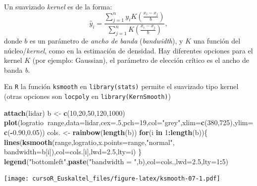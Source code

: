 \documentclass[]{book}
\newenvironment{Shaded}{\begin{snugshade}}{\end{snugshade}}
\newcommand{\KeywordTok}[1]{\textcolor[rgb]{0.13,0.29,0.53}{\textbf{#1}}}
\newcommand{\DataTypeTok}[1]{\textcolor[rgb]{0.13,0.29,0.53}{#1}}
\newcommand{\DecValTok}[1]{\textcolor[rgb]{0.00,0.00,0.81}{#1}}
\newcommand{\FloatTok}[1]{\textcolor[rgb]{0.00,0.00,0.81}{#1}}
\newcommand{\StringTok}[1]{\textcolor[rgb]{0.31,0.60,0.02}{#1}}
\newcommand{\ControlFlowTok}[1]{\textcolor[rgb]{0.13,0.29,0.53}{\textbf{#1}}}
\newcommand{\OperatorTok}[1]{\textcolor[rgb]{0.81,0.36,0.00}{\textbf{#1}}}
\newcommand{\NormalTok}[1]{#1}
\begin{document}
Un suavizado \emph{kernel} es de la forma: \[
\hat{y}_i = \frac{\sum_{j=1}^n y_i K\left( \frac{x_i-x_j}{b}\right)}{\sum_{j=1}^n K\left( \frac{x_i-x_j}{b}\right)},
\] donde \(b\) es un parámetro de \emph{ancho de banda}
(\emph{bandwidth}), y \(K\) una función del núcleo/\emph{kernel}, como
en la estimación de densidad. Hay diferentes opciones para el kernel
\(K\) (por ejemplo: Gaussian), el parámetro de elección crítico es el
ancho de banda \emph{b}.

En \texttt{R} la función \texttt{ksmooth} en \texttt{library(stats)}
permite el suavizado tipo kernel (otras opciones son \texttt{locpoly} en
\texttt{library(KernSmooth)})

\begin{Shaded}
\begin{Highlighting}[]
\KeywordTok{attach}\NormalTok{(lidar)}
\NormalTok{b <-}\StringTok{ }\KeywordTok{c}\NormalTok{(}\DecValTok{10}\NormalTok{,}\DecValTok{20}\NormalTok{,}\DecValTok{50}\NormalTok{,}\DecValTok{120}\NormalTok{,}\DecValTok{1000}\NormalTok{)}
\KeywordTok{plot}\NormalTok{(logratio}\OperatorTok{~}\NormalTok{range,}\DataTypeTok{data=}\NormalTok{lidar,}\DataTypeTok{cex=}\NormalTok{.}\DecValTok{5}\NormalTok{,}\DataTypeTok{pch=}\DecValTok{19}\NormalTok{,}\DataTypeTok{col=}\StringTok{"grey"}\NormalTok{,}\DataTypeTok{xlim=}\KeywordTok{c}\NormalTok{(}\DecValTok{380}\NormalTok{,}\DecValTok{725}\NormalTok{),}\DataTypeTok{ylim=}\KeywordTok{c}\NormalTok{(}\OperatorTok{-}\FloatTok{0.90}\NormalTok{,}\FloatTok{0.05}\NormalTok{))}
\NormalTok{cols. <-}\StringTok{ }\KeywordTok{rainbow}\NormalTok{(}\KeywordTok{length}\NormalTok{(b))}
\ControlFlowTok{for}\NormalTok{(i }\ControlFlowTok{in} \DecValTok{1}\OperatorTok{:}\KeywordTok{length}\NormalTok{(b))\{}
  \KeywordTok{lines}\NormalTok{(}\KeywordTok{ksmooth}\NormalTok{(range,logratio,}\DataTypeTok{x.points=}\NormalTok{range,}\StringTok{"normal"}\NormalTok{, }\DataTypeTok{bandwidth=}\NormalTok{b[i]),}\DataTypeTok{col=}\NormalTok{cols.[i],}\DataTypeTok{lwd=}\FloatTok{2.5}\NormalTok{,}\DataTypeTok{lty=}\NormalTok{i)}
\NormalTok{\}}
\KeywordTok{legend}\NormalTok{(}\StringTok{"bottomleft"}\NormalTok{,}\KeywordTok{paste}\NormalTok{(}\StringTok{"bandwidth = "}\NormalTok{,b),}\DataTypeTok{col=}\NormalTok{cols.,}\DataTypeTok{lwd=}\FloatTok{2.5}\NormalTok{,}\DataTypeTok{lty=}\DecValTok{1}\OperatorTok{:}\DecValTok{5}\NormalTok{)}
\end{Highlighting}
\end{Shaded}

\texttt{[image: cursoR\_Euskaltel\_files/figure-latex/ksmooth-07-1.pdf]}
\end{document}

